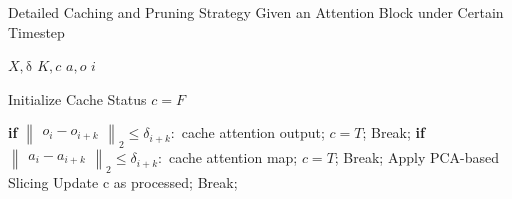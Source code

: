 
\begin{algorithm}
\caption{Detailed Caching and Pruning Strategy Given an Attention Block under Certain Timestep}
\begin{algorithmic}
\Require $X, \text{δ}$ 
\Require $K, c$ 
\Require $a, o$ 
\Require $i$ 

\State Initialize Cache Status $c=F$


\State \textbf{if }{$\begin{Vmatrix}o_{i} - o_{i+k}\end{Vmatrix} _{2} \le \delta_{i+k}:$}
        cache attention output; $c=T$; Break;
    \EndFor
{}
\State \textbf{if }{$\begin{Vmatrix}a_{i} - a_{i+k}\end{Vmatrix} _{2} \le \delta_{i+k}:$}
        cache attention map; $c=T$; Break;
    \EndFor
\State Apply PCA-based Slicing
\State Update c as processed; Break;
\EndIf

\end{algorithmic}
\end{algorithm}


